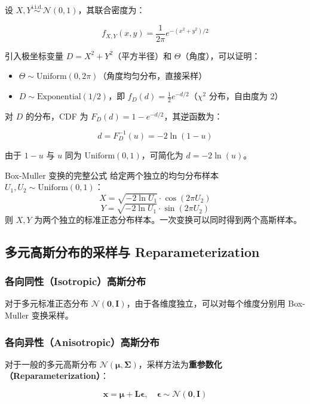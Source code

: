 \documentclass[a4paper]{article}
\begin{document}
设 $X, Y \overset{\text{i.i.d.}}{\sim} \mathcal{N}(0, 1)$，其联合密度为：

$$f_{X,Y}(x, y) = \frac{1}{2\pi} e^{-(x^2 + y^2)/2}$$

引入极坐标变量 $D = X^2 + Y^2$（平方半径）和 $\Theta$（角度），可以证明：

\begin{itemize}
    \item $\Theta \sim \text{Uniform}(0, 2\pi)$（角度均匀分布，直接采样）
    \item $D \sim \text{Exponential}(1/2)$，即 $f_D(d) = \frac{1}{2}e^{-d/2}$（$\chi^2$ 分布，自由度为 2）
\end{itemize}

对 $D$ 的分布，CDF 为 $F_D(d) = 1 - e^{-d/2}$，其逆函数为：

$$d = F_D^{-1}(u) = -2\ln(1 - u)$$

由于 $1-u$ 与 $u$ 同为 $\text{Uniform}(0,1)$，可简化为 $d = -2\ln(u)$。

\begin{importantbox}{Box-Muller 变换的完整公式}
给定两个独立的均匀分布样本 $U_1, U_2 \sim \text{Uniform}(0,1)$：
$$X = \sqrt{-2\ln U_1} \cdot \cos(2\pi U_2)$$
$$Y = \sqrt{-2\ln U_1} \cdot \sin(2\pi U_2)$$
则 $X, Y$ 为两个独立的标准正态分布样本。一次变换可以同时得到两个高斯样本。
\end{importantbox}

\subsection{多元高斯分布的采样与 Reparameterization}

\subsubsection{各向同性（Isotropic）高斯分布}

对于多元标准正态分布 $\mathcal{N}(\mathbf{0}, \mathbf{I})$，由于各维度独立，可以对每个维度分别用 Box-Muller 变换采样。

\subsubsection{各向异性（Anisotropic）高斯分布}

对于一般的多元高斯分布 $\mathcal{N}(\boldsymbol{\mu}, \boldsymbol{\Sigma})$，采样方法为\textbf{重参数化（Reparameterization）}：

$$\mathbf{x} = \boldsymbol{\mu} + \mathbf{L} \boldsymbol{\epsilon}, \quad \boldsymbol{\epsilon} \sim \mathcal{N}(\mathbf{0}, \mathbf{I})$$
\end{document}
